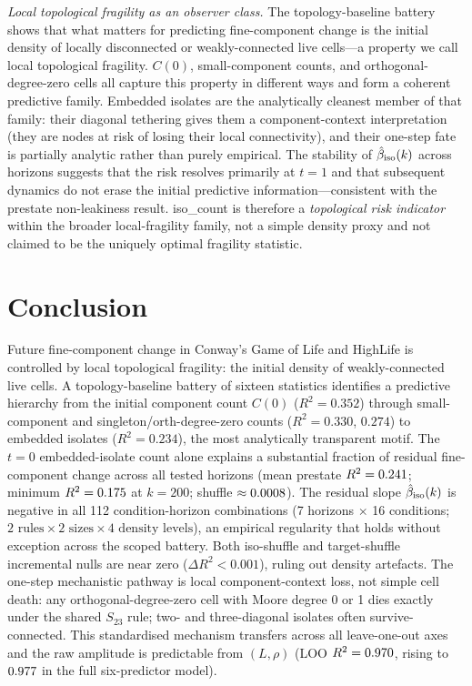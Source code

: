 \documentclass[aip,cha,preprint,nofootinbib]{revtex4-2}
\newcommand{\topCompCountR}{0.352}
\newcommand{\topSmallLeqFourR}{0.330}
\newcommand{\topSingletonR}{0.274}
\newcommand{\topIsoEmbeddedR}{0.234}
\newcommand{\iso}{{\rm iso}}
\newcommand{\biso}{\hat{\beta}_{\iso}}
\begin{document}
\textit{Local topological fragility as an observer class.}
The topology-baseline battery shows that what matters for predicting
fine-component change is the initial density of locally disconnected or
weakly-connected live cells---a property we call local topological fragility.
$C(0)$, small-component counts, and orthogonal-degree-zero cells all
capture this property in different ways and form a coherent predictive
family.
Embedded isolates are the analytically cleanest member of that family:
their diagonal tethering gives them a component-context interpretation
(they are nodes at risk of losing their local connectivity), and their
one-step fate is partially analytic rather than purely empirical.
The stability of $\biso(k)$ across horizons suggests that the risk resolves
primarily at $t=1$ and that subsequent dynamics do not erase the initial
predictive information---consistent with the prestate non-leakiness result.
iso\_count is therefore a \emph{topological risk indicator} within the
broader local-fragility family, not a simple density proxy and not claimed
to be the uniquely optimal fragility statistic.

\section{Conclusion}
\label{sec:conclusion}

Future fine-component change in Conway's Game of Life and HighLife is
controlled by local topological fragility: the initial density of
weakly-connected live cells.
A topology-baseline battery of sixteen statistics identifies a predictive
hierarchy from the initial component count $C(0)$ ($R^2 = \topCompCountR$)
through small-component and singleton/orth-degree-zero counts
($R^2 = \topSmallLeqFourR$, $\topSingletonR$) to embedded isolates
($R^2 = \topIsoEmbeddedR$), the most analytically transparent motif.
The $t=0$ embedded-isolate count alone explains a substantial fraction of
residual fine-component change across all tested horizons
(mean prestate $R^2 = 0.241$; minimum $R^2 = 0.175$
at $k=200$; shuffle $\approx 0.0008$).
The residual slope $\biso(k)$ is negative in all 112 condition-horizon
combinations (7 horizons $\times$ 16 conditions;
$2 \text{ rules} \times 2 \text{ sizes} \times 4 \text{ density levels}$),
an empirical regularity that holds without exception across the scoped battery.
Both iso-shuffle and target-shuffle incremental nulls are near zero
($\Delta R^2 < 0.001$), ruling out density artefacts.
The one-step mechanistic pathway is local component-context loss, not simple cell
death: any orthogonal-degree-zero cell with Moore degree 0 or 1 dies exactly
under the shared $S_{23}$ rule; two- and three-diagonal isolates often
survive-connected.
This standardised mechanism transfers across all leave-one-out axes
and the raw amplitude is predictable from $(L,\rho)$
(LOO $R^2 = 0.970$, rising to $0.977$ in the full
six-predictor model).
\end{document}
